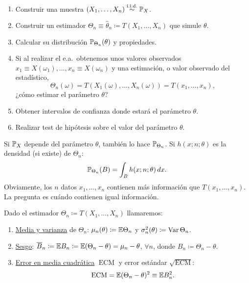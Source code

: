 \begin{definicion} \, 
\begin{enumerate}
  \item Construir una muestra $(X_1, \dots, X_n) \stackrel{\text{i.i.d.}}{\sim} \mathbb{P}_X$.
  \item Construir un estimador $\Theta_n \equiv \hat{\theta}_n \coloneqq T(X_1, \dots, X_n)$ que simule $\theta$.
  \item Calcular su distribución $\mathbb{P}_{\Theta_n}(\theta)$ y propiedades.
  \item Si al realizar el e.a.\ obtenemos unos valores observados $x_1 \equiv X(\omega_1), \dots, x_n \equiv X(\omega_n)$ y una estimación, o valor observado del estadístico,
        \[
          \Theta_n(\omega) = T(X_1(\omega), \dots, X_n(\omega)) = T(x_1, \dots, x_n),
        \]
        ¿cómo estimar el parámetro $\theta$?
  \item Obtener intervalos de confianza donde estará el parámetro $\theta$.
  \item Realizar test de hipótesis sobre el valor del parámetro $\theta$.
\end{enumerate}
\end{definicion}

Si $\mathbb{P}_X$ depende del parámetro $\theta$, también lo hace $\mathbb{P}_{\Theta_n}$. Si $h(x; n; \theta)$ es la densidad (si existe) de $\Theta_n$:
\[
  \mathbb{P}_{\Theta_n}(B) = \int_B h(x; n; \theta)\,dx.
\]
Obviamente, los $n$ datos $x_1, \dots, x_n$ contienen más información que $T(x_1, \dots, x_n)$. La pregunta es cuándo contienen igual información.

\begin{definicion}[5]
Dado el estimador $\Theta_n \coloneqq T(X_1, \dots, X_n)$ llamaremos:
\begin{enumerate}
  \item \underline{Media y varianza} de $\Theta_n$: $\mu_n(\theta) \coloneqq \mathbb{E}\Theta_n$ y $\sigma_n^2(\theta) \coloneqq \operatorname{Var}\Theta_n$.
  \item \underline{Sesgo}: $\overline{B}_n \coloneqq \mathbb{E} B_n \coloneqq \mathbb{E}(\Theta_n - \theta) = \mu_n - \theta$, $\forall n$, donde $B_n \coloneqq \Theta_n - \theta$.
  \item \underline{Error en media cuadrática} $\operatorname{ECM}$ y error estándar $\sqrt{\operatorname{ECM}}$:
        \[
          \operatorname{ECM} = \mathbb{E}(\Theta_n - \theta)^2 \equiv \mathbb{E} B_n^2.
        \]
\end{enumerate}
\end{definicion}

